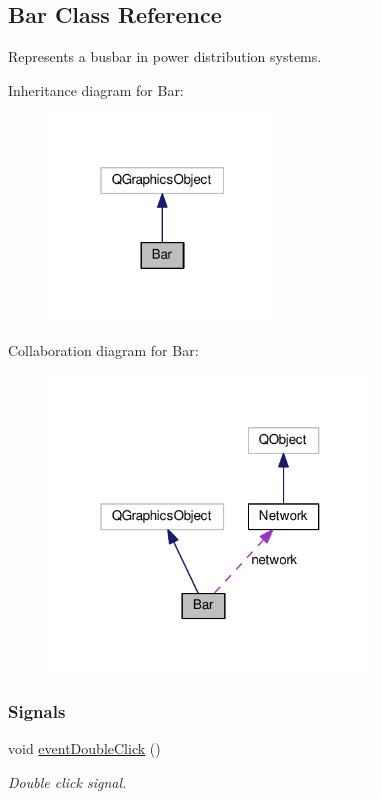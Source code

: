 \hypertarget{class_bar}{}\subsection{Bar Class Reference}
\label{class_bar}


Represents a busbar in power distribution systems.  




Inheritance diagram for Bar\+:
\nopagebreak
\begin{figure}[H]
\begin{center}
\leavevmode
\includegraphics[width=172pt]{class_bar__inherit__graph}
\end{center}
\end{figure}


Collaboration diagram for Bar\+:
\nopagebreak
\begin{figure}[H]
\begin{center}
\leavevmode
\includegraphics[width=244pt]{class_bar__coll__graph}
\end{center}
\end{figure}
\subsubsection*{Signals}
\begin{DoxyCompactItemize}
\item 
void \hyperlink{class_bar_a66bcbd19582dddee7e171ae5a4475f4b}{event\+Double\+Click} ()
\begin{DoxyCompactList}\small\item\em Double click signal. \end{DoxyCompactList}\end{DoxyCompactItemize}
